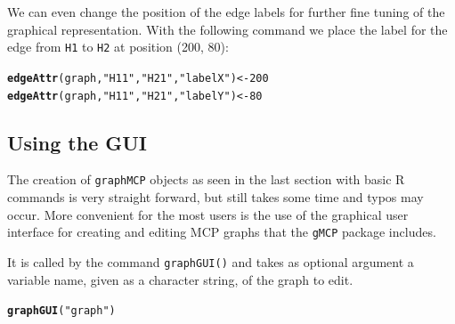 \documentclass[a4paper, 10pt]{article}\usepackage[]{graphicx}\usepackage[]{color}
\makeatletter
\newcommand{\hlnum}[1]{\textcolor[rgb]{0.686,0.059,0.569}{#1}}%
\newcommand{\hlstr}[1]{\textcolor[rgb]{0.192,0.494,0.8}{#1}}%
\newcommand{\hlstd}[1]{\textcolor[rgb]{0.345,0.345,0.345}{#1}}%
\newcommand{\hlkwb}[1]{\textcolor[rgb]{0.69,0.353,0.396}{#1}}%
\newcommand{\hlkwd}[1]{\textcolor[rgb]{0.737,0.353,0.396}{\textbf{#1}}}%
\newenvironment{kframe}{%
 \def\at@end@of@kframe{}%
 \ifinner\ifhmode%
  \def\at@end@of@kframe{\end{minipage}}%
  \begin{minipage}{\columnwidth}%
 \fi\fi%
 \def\FrameCommand##1{\hskip\@totalleftmargin \hskip-\fboxsep
 \colorbox{shadecolor}{##1}\hskip-\fboxsep
     \hskip-\linewidth \hskip-\@totalleftmargin \hskip\columnwidth}%
 \MakeFramed {\advance\hsize-\width
   \@totalleftmargin\z@ \linewidth\hsize
   \@setminipage}}%
 {\par\unskip\endMakeFramed%
 \at@end@of@kframe}
\newenvironment{knitrout}{}{} %
\numberwithin{equation}{section}
\theoremstyle{definition}
\theoremstyle{plain}
\makeatother
\begin{document}
We can even change the position of the edge labels for further fine
tuning of the graphical representation.  With the following command we
place the label for the edge from \texttt{H1} to \texttt{H2} at
position (200, 80):

\begin{knitrout}\footnotesize
{}\color{fgcolor}\begin{kframe}
\begin{alltt}
\hlkwd{edgeAttr}\hlstd{(graph,} \hlstr{"H11"}\hlstd{,} \hlstr{"H21"}\hlstd{,} \hlstr{"labelX"}\hlstd{)} \hlkwb{<-} \hlnum{200}
\hlkwd{edgeAttr}\hlstd{(graph,} \hlstr{"H11"}\hlstd{,} \hlstr{"H21"}\hlstd{,} \hlstr{"labelY"}\hlstd{)} \hlkwb{<-} \hlnum{80}
\end{alltt}
\end{kframe}
\end{knitrout}


\subsection{Using the GUI}

The creation of \texttt{graphMCP} objects as seen in the last section 
with basic R commands is very straight forward,
but still takes some time and typos may occur.  More convenient for
the most users is the use of the graphical user interface for
creating and editing MCP graphs that the \texttt{gMCP} package
includes.

It is called by the command \texttt{graphGUI()} and takes as optional
argument a variable name, given as a character string, of the graph to
edit.

\begin{knitrout}\footnotesize
{}\color{fgcolor}\begin{kframe}
\begin{alltt}
\hlkwd{graphGUI}\hlstd{(}\hlstr{"graph"}\hlstd{)}
\end{alltt}
\end{kframe}
\end{knitrout}
\end{document}
